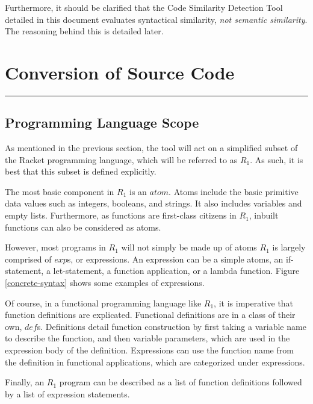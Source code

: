 \documentclass[12pt]{article}
\newcommand{\R}{\ensuremath{\mathit{R_{1}}}}
\newcommand{\itm}[1]{\ensuremath{\mathit{#1}}}
\newcommand{\Atm}[0]{\itm{atom}}
\newcommand{\Exp}[0]{\itm{exp}}
\newcommand{\Def}[0]{\itm{def}}
\newcommand{\usection}[1]{\section{#1}\hrule\hfill}
\begin{document}
\hfill

Furthermore, it should be clarified that the Code Similarity Detection Tool detailed in this document evaluates syntactical similarity, \emph{not semantic similarity}. The reasoning behind this is detailed later.

\usection{Conversion of Source Code}

\subsection{Programming Language Scope}

As mentioned in the previous section, the tool will act on a simplified subset of the Racket programming language, which will be referred to as \R{}. As such, it is best that this subset is defined explicitly.

\hfill

The most basic component in \R{} is an \Atm{}. Atoms include the basic primitive data values such as integers, booleans, and strings. It also includes variables and empty lists. Furthermore, as functions are first-class citizens in \R{}, inbuilt functions can also be considered as atoms.

\hfill

However, most programs in \R{} will not simply be made up of atoms \textemdash \R{} is largely comprised of \Exp{}s, or expressions. An expression can be a simple atoms, an if-statement, a let-statement, a function application, or a lambda function. Figure \ref{concrete-syntax} shows some examples of expressions.

\hfill

Of course, in a functional programming language like \R{}, it is imperative that function definitions are explicated. Functional definitions are in a class of their own, \Def{}s. Definitions detail function construction by first taking a variable name to describe the function, and then variable parameters, which are used in the expression body of the definition. Expressions can use the function name from the definition in functional applications, which are categorized under expressions.

\hfill

Finally, an \R{} program can be described as a list of function definitions followed by a list of expression statements.
\end{document}
